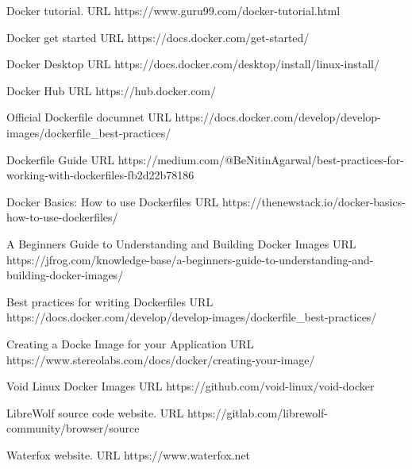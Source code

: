 \documentclass{article}  %
\begin{document}
\begin{thebibliography}{99}

Docker tutorial.
URL https://www.guru99.com/docker-tutorial.html

Docker get started 
URL https://docs.docker.com/get-started/

Docker Desktop
URL https://docs.docker.com/desktop/install/linux-install/

Docker Hub
URL https://hub.docker.com/

Official Dockerfile documnet
URL https://docs.docker.com/develop/develop-images/dockerfile\_best-practices/

Dockerfile Guide
URL https://medium.com/@BeNitinAgarwal/best-practices-for-working-with-dockerfiles-fb2d22b78186

Docker Basics: How to use Dockerfiles
URL https://thenewstack.io/docker-basics-how-to-use-dockerfiles/

A Beginners Guide to Understanding and Building Docker Images
URL https://jfrog.com/knowledge-base/a-beginners-guide-to-understanding-and-building-docker-images/

Best practices for writing Dockerfiles
URL https://docs.docker.com/develop/develop-images/dockerfile\_best-practices/


Creating a Docke Image for your Application
URL https://www.stereolabs.com/docs/docker/creating-your-image/

Void Linux Docker Images
URL https://github.com/void-linux/void-docker


LibreWolf source code website.
URL https://gitlab.com/librewolf-community/browser/source


Waterfox website. URL https://www.waterfox.net


\end{thebibliography}
\end{document}
